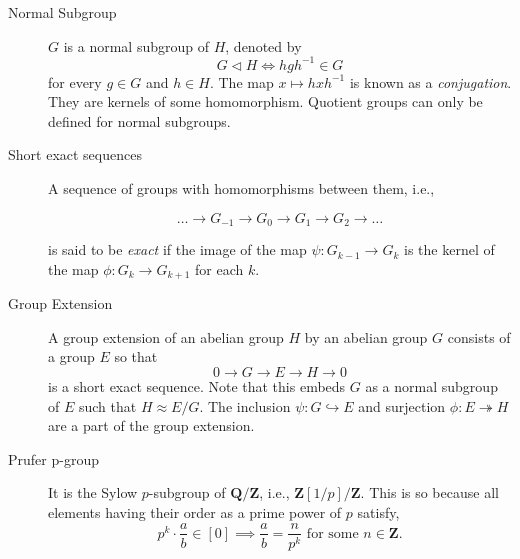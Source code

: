 \documentclass{scrbook}
\theoremstyle{definition}\newtheorem{defn}{Definition}
\theoremstyle{definition}\newtheorem*{rmk}{Remark}
\newcommand{\Z}{\mathbf{Z}}
\newcommand{\Q}{\mathbf{Q}}
\begin{document}
\begin{description}
  \item[Normal Subgroup] $G$ is a normal subgroup of $H$, denoted by 
    \[G \triangleleft H \iff hgh^{-1} \in G\] 
    for every $g \in G$ and $h
    \in H$. The map $x \mapsto hxh^{-1}$ is known as a \emph{conjugation}. They
    are kernels of some homomorphism. Quotient groups can only be defined for
    normal subgroups.

  \item[Short exact sequences]  A sequence of groups with homomorphisms
    between them, i.e., 

    \[ \dots \to G_{-1} \to G_{0} \to G_{1} \to G_{2} \to \dots \]

    is said to be \emph{exact} if the image of the map $\psi: G_{k-1} \to G_k$ 
    is the kernel of the map $\phi: G_k \to G_{k+1}$ for each $k$.

  \item[Group Extension] A group extension of an abelian group $H$ by an abelian
    group $G$ consists of a group $E$ so that 
    \[ 0 \to G \to E \to H \to 0 \]
    is a short exact sequence. Note that this embeds $G$ as a normal subgroup of
    $E$ such that $H \approx E/G$. The inclusion $\psi: G \hookrightarrow E$ and 
    surjection $\phi: E \twoheadrightarrow H$ are a part of the group extension.

  \item[Prufer p-group] It is the Sylow $p$-subgroup of $\Q/\Z$, i.e.,
    $\Z[1/p]/\Z$. This is so because all elements having their order as a prime
    power of $p$ satisfy,
    \[p^k \cdot \frac ab \in [0] \implies \frac ab = \frac n{p^k} \text{ for
    some } n \in \Z.\]

\end{description}





 
\end{document}
